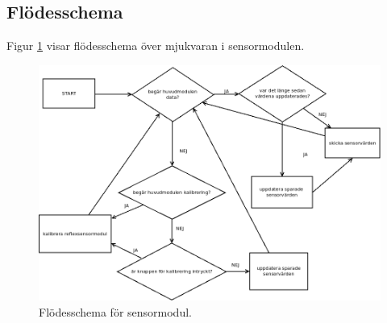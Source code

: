 \subsection{Flödesschema}
Figur \ref{systemskiss:sensorschema} visar flödesschema över mjukvaran i sensormodulen.

\begin{figure}[h]
\center
\includegraphics[scale=0.4]{sensorflow}
\caption{Flödesschema för sensormodul.} \label{systemskiss:sensorschema}
\end{figure}

%
